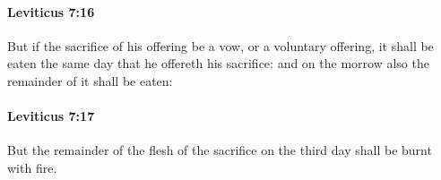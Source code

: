 		\paragraph{Leviticus 7:16} %
			\label{LEVITICUS-7-16}

			But if the sacrifice of his offering be a vow, or a voluntary offering, it shall be eaten the same day that he offereth his sacrifice: and on the morrow also the remainder of it shall be eaten:


		\paragraph{Leviticus 7:17} %
			\label{LEVITICUS-7-17}

			But the remainder of the flesh of the sacrifice on the third day shall be burnt with fire.


